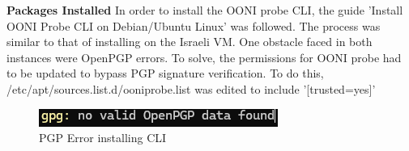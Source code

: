 \textbf{Packages Installed}
In order to install the OONI probe CLI, the guide 'Install OONI Probe CLI on Debian/Ubuntu Linux' \cite{ooni-cli-install} was followed. The process was similar to that of installing on the Israeli VM. One obstacle faced in both instances were OpenPGP errors. To solve, the permissions for OONI probe had to be updated to bypass PGP signature verification. To do this, /etc/apt/sources.list.d/ooniprobe.list was edited to include '[trusted=yes]'

\begin{figure} [H]
    \centering
    \includegraphics[width=0.5\linewidth]{PGPERROR.png}
    \caption{PGP Error installing CLI}
    \label{fig:enter-label}
\end{figure}


